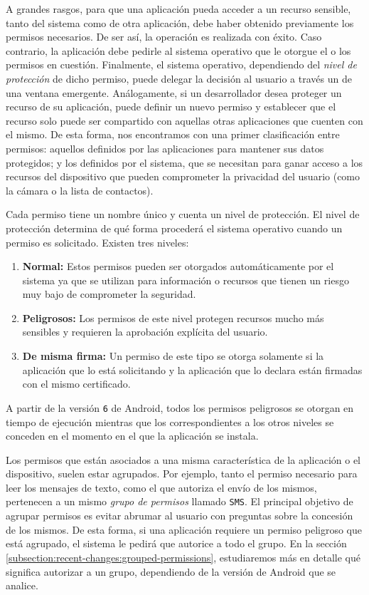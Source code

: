 A grandes rasgos, para que una aplicación pueda acceder a un recurso sensible, tanto del sistema
como de otra aplicación, debe haber obtenido previamente los permisos necesarios. De ser así, la
operación es realizada con éxito. Caso contrario, la aplicación debe pedirle al sistema operativo
que le otorgue el o los permisos en cuestión. Finalmente, el sistema operativo, dependiendo del
\textit{nivel de protección} de dicho permiso, puede delegar la decisión al usuario a través un de
una ventana emergente. Análogamente, si un desarrollador desea proteger un recurso de su aplicación,
puede definir un nuevo permiso y establecer que el recurso solo puede ser compartido con aquellas
otras aplicaciones que cuenten con el mismo. De esta forma, nos encontramos con una primer
clasificación entre permisos: aquellos definidos por las aplicaciones para mantener sus datos
protegidos; y los definidos por el sistema, que se necesitan para ganar acceso a los recursos del
dispositivo que pueden comprometer la privacidad del usuario (como la cámara o la lista de
contactos).

Cada permiso tiene un nombre único y cuenta un nivel de protección. El nivel de protección determina
de qué forma procederá el sistema operativo cuando un permiso es solicitado. Existen tres niveles:

\begin{enumerate}
    \item \textbf{Normal:} Estos permisos pueden ser otorgados automáticamente por el sistema ya que
          se utilizan para información o recursos que tienen un riesgo muy bajo de comprometer la
          seguridad.
    \item \textbf{Peligrosos:} Los permisos de este nivel protegen recursos mucho más sensibles y
          requieren la aprobación explícita del usuario.
    \item \textbf{De misma firma:} Un permiso de este tipo se otorga solamente si la aplicación que
          lo está solicitando y la aplicación que lo declara están firmadas con el mismo
          certificado.
\end{enumerate}

A partir de la versión \texttt{6} de Android, todos los permisos peligrosos se otorgan en tiempo de
ejecución mientras que los correspondientes a los otros niveles se conceden en el momento en el que
la aplicación se instala.

Los permisos que están asociados a una misma característica de la aplicación o el dispositivo,
suelen estar agrupados. Por ejemplo, tanto el permiso necesario para leer los mensajes de texto,
como el que autoriza el envío de los mismos, pertenecen a un mismo \textit{grupo de permisos}
llamado \texttt{SMS}. El principal objetivo de agrupar permisos es evitar abrumar al usuario con
preguntas sobre la concesión de los mismos. De esta forma, si una aplicación requiere un permiso
peligroso que está agrupado, el sistema le pedirá que autorice a todo el grupo. En la sección
\ref{subsection:recent-changes:grouped-permissions}, estudiaremos más en detalle qué significa
autorizar a un grupo, dependiendo de la versión de Android que se analice.

